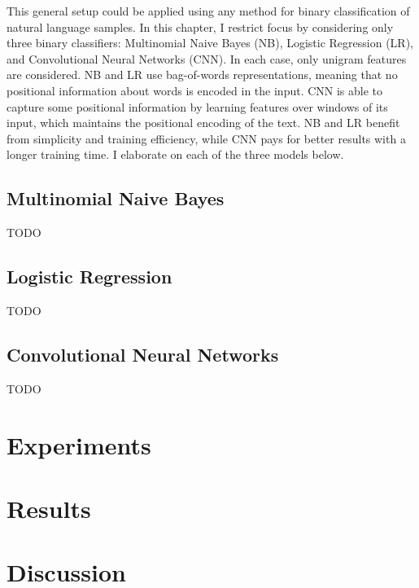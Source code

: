 This general setup could be applied using any method for binary classification of natural language samples. In this chapter, I restrict focus by considering only three binary classifiers: Multinomial Naive Bayes (NB), Logistic Regression (LR), and Convolutional Neural Networks (CNN). In each case, only unigram features are considered. NB and LR use bag-of-words representations, meaning that no positional information about words is encoded in the input. CNN is able to capture some positional information by learning features over windows of its input, which maintains the positional encoding of the text. NB and LR benefit from simplicity and training efficiency, while CNN pays for better results with a longer training time. I elaborate on each of the three models below.

\subsection{Multinomial Naive Bayes}

TODO

\subsection{Logistic Regression}

TODO

\subsection{Convolutional Neural Networks}

TODO

\section{Experiments}

\section{Results}

\section{Discussion}
